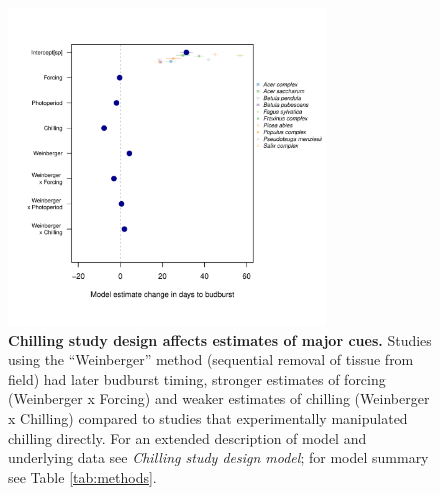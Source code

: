 \documentclass{article}
\begin{document}
\begin{figure}[h!]
\centering
\noindent \includegraphics[width=0.75\textwidth]{..//..//analyses/figures/weinberger_MU_4supp.pdf}
\caption{\textbf{Chilling study design affects estimates of major cues.} Studies using the ``Weinberger'' method (sequential removal of tissue from field) had later budburst timing, stronger estimates of forcing (Weinberger x Forcing) and weaker estimates of chilling (Weinberger x Chilling) compared to studies that experimentally manipulated chilling directly. For an extended description of model and underlying data see \emph{Chilling study design model}; for model summary see Table \ref{tab:methods}.}
\label{fig:weinberger}
\end{figure}
\end{document}
